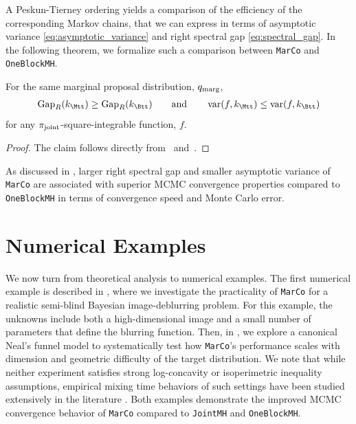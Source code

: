 \documentclass[onefignum,onetabnum]{siamonline250211}
\newcommand{\MarCo}{\textnormal{\texttt{MarCo}}\xspace}
\newcommand{\Joint}{\textnormal{\texttt{JointMH}}\xspace}
\newcommand{\OneblockMCMC}{\textnormal{\texttt{OneBlockMH}}\xspace}
\begin{document}
A Peskun-Tierney ordering yields a comparison of the efficiency of the corresponding Markov chains, that we can express in terms of asymptotic variance \eqref{eq:asymptotic_variance} and right spectral gap \eqref{eq:spectral_gap}. In the following theorem, we formalize such a comparison between \MarCo and \OneblockMCMC.
%
%
%
%

%

%

%

\begin{theorem}
%
For the same marginal proposal distribution, $q_{\rm marg}$, 
\begin{align*}
    \operatorname{Gap}_R(k_{\Mtt})\ge\operatorname{Gap}_R(k_{\Btt}) \qquad\text{and}\qquad \operatorname{var}(f,k_{\Mtt})\le\operatorname{var}(f,k_{\Btt})
\end{align*}
for any $\pi_{\rm joint}$-square-integrable function, $f$. 
\end{theorem}

\begin{proof}
    The claim follows directly from~ and~\cite[Theorem 2]{andrieu_establishing_2016}.
\end{proof}

As discussed in , larger right spectral gap and smaller asymptotic variance of \MarCo are associated with superior MCMC convergence properties compared to \OneblockMCMC in terms of convergence speed and Monte Carlo error.
 

%
\section{Numerical Examples}
\label{sec:numerics}

We now turn from theoretical analysis to numerical examples.
The first numerical example is described in , where we investigate the practicality of \MarCo for a realistic semi-blind Bayesian image-deblurring problem.
For this example, the unknowns include both a high-dimensional image and a small number of parameters that define the blurring function.
Then, in , we explore a canonical Neal's funnel model to systematically test how \MarCo's performance scales with dimension and geometric difficulty of the target distribution.
We note that while neither experiment satisfies  strong log-concavity or isoperimetric inequality assumptions, empirical mixing time behaviors of such settings have been studied extensively in the literature \cite{dwivedi_log-concave_2019,wu_minimax_2022}.
%
Both examples demonstrate the improved MCMC convergence behavior of \MarCo compared to \Joint and \OneblockMCMC. 
%
%
%
\end{document}
